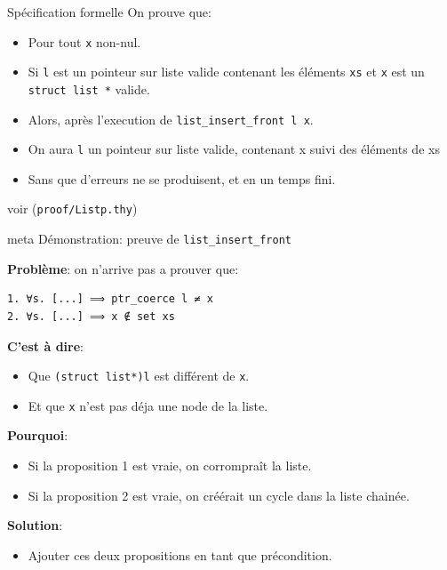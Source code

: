\documentclass[hyperref={pdfpagelabels=false}]{beamer}
\begin{document}
\begin{frame}[fragile]{Spécification formelle}
  On prouve que:\\
  \begin{itemize}
    \item<2-> Pour tout \texttt{x} non-nul.
    \item<3-> Si \texttt{l} est un pointeur sur liste valide contenant les éléments \texttt{xs} et \texttt{x} est un \texttt{struct list *} valide.
    \item<4-> Alors, après l'execution de \texttt{list\_insert\_front l x}.
    \item<5-> On aura \texttt{l} un pointeur sur liste valide, contenant x suivi des éléments de xs
    \item<6-> Sans que d'erreurs ne se produisent, et en un temps fini.
  \end{itemize}

  \vfill
  \hfill
  {\tiny voir (\texttt{proof/Listp.thy})}
\end{frame}

\begin{frame}

  \begin{beamercolorbox}[sep=8pt,center,shadow=true,rounded=true]{meta}
    Démonstration: preuve de \texttt{list\_insert\_front}\par%
  \end{beamercolorbox}
\end{frame}

\begin{frame}[fragile]
  \textbf{Problème}: on n'arrive pas a prouver que:
  \begin{lstlisting}
1. ∀s. [...] ⟹ ptr_coerce l ≠ x
2. ∀s. [...] ⟹ x ∉ set xs
  \end{lstlisting}
  \pause
  \textbf{C'est à dire}:
  \begin{itemize}
    \item Que \texttt{(struct list*)l} est différent de \texttt{x}.
    \item Et que \texttt{x} n'est pas déja une node de la liste.
  \end{itemize}
  \pause
  \textbf{Pourquoi}:
  \begin{itemize}
    \item Si la proposition 1 est vraie, on corrompraît la liste.
    \item Si la proposition 2 est vraie, on créérait un cycle dans la liste chainée.
  \end{itemize}
  \pause
  \textbf{Solution}:
  \begin{itemize}
    \item Ajouter ces deux propositions en tant que précondition.
  \end{itemize}
\end{frame}
\end{document}
